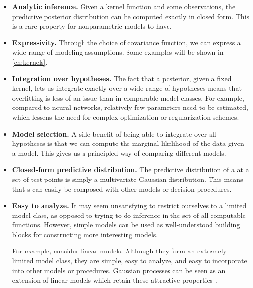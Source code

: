 \begin{itemize}

\item {\bf Analytic inference.}
Given a kernel function and some observations, the predictive posterior distribution can be computed exactly in closed form.
This is a rare property for nonparametric models to have.

\item {\bf Expressivity.}
Through the choice of covariance function, we can express a wide range of modeling assumptions.
Some examples will be shown in \cref{ch:kernels}.

\item {\bf Integration over hypotheses.}
The fact that a \gp{} posterior, given a fixed kernel, lets us integrate exactly over a wide range of hypotheses means that overfitting is less of an issue than in comparable model classes.
For example, compared to neural networks, relatively few parameters need to be estimated, which lessens the need for complex optimization or regularization schemes.
%

\item {\bf Model selection.}
A side benefit of being able to integrate over all hypotheses is that we can compute the marginal likelihood of the data given a model.
This gives us a principled way of comparing different models.

\item {\bf Closed-form predictive distribution.}
The predictive distribution of a \gp{} at a set of test points is simply a multivariate Gaussian distribution.
This means that \gp{}s can easily be composed with other models or decision procedures.

\item {\bf Easy to analyze.}
It may seem unsatisfying to restrict ourselves to a limited model class, as opposed to trying to do inference in the set of all computable functions.
However, simple models can be used as well-understood building blocks for constructing more interesting models. %

For example, consider linear models.
Although they form an extremely limited model class, they are simple, easy to analyze, and easy to incorporate into other models or procedures.
Gaussian processes can be seen as an extension of linear models which retain these attractive properties~\citep[chapter 2]{rasmussen38gaussian}.


\end{itemize}




